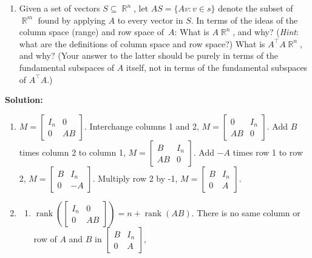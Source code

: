 \documentclass{article}
\DeclareMathOperator{\rank}{\mathrm{rank}}
\DeclareMathOperator{\R}{\mathbb{R}}
\newenvironment{solution}{\color{blue} \smallskip \textbf{Solution:}}{}
\begin{document}
\begin{enumerate}
\begin{enumerate}
        \item
        Given a set of vectors $S \subseteq \R^n$, let $AS = \{ Av: v \in s \}$ denote the subset of $\R^m$ found by applying $A$ to every vector in $S$.
        In terms of the ideas of the column space (range) and row space of~$A$: 
        What is $A\R^n$, and why? (\emph{Hint}: what are the definitions of column space and row space?)
        What is $A^\top A\R^n$, and why? (Your answer to the latter should be purely in terms of the fundamental subspaces of $A$ itself, not in terms of the fundamental subspaces of $A^\top A$.)
    \end{enumerate}
    
    \begin{solution}
        \begin{enumerate}
        \item$
            M = \begin{bmatrix}
            I_n & 0 \\
            0 & AB
            \end{bmatrix}
        $. Interchange columns 1 and 2, $
            M = \begin{bmatrix}
            0 & I_n \\
            AB & 0
            \end{bmatrix}
        $. Add $B$ times column 2 to column 1, $
            M = \begin{bmatrix}
            B & I_n \\
            AB & 0
            \end{bmatrix}
        $. Add $-A$ times row 1 to row 2, $
            M = \begin{bmatrix}
            B & I_n \\
            0 & -A
            \end{bmatrix}
        $. Multiply row 2 by -1, $
        M = \begin{bmatrix}
            B & I_n \\
            0 & A
            \end{bmatrix}
        $.
        \item 
        \begin{enumerate}
            \item
            $\rank(\begin{bmatrix} I_n & 0 \\ 0 & AB \end{bmatrix}) = n + \rank(AB)$. 
            There is no same column or row of $A$ and $B$ in $\begin{bmatrix} B & I_n \\ 0 & A \end{bmatrix}$, 

\end{enumerate}
\end{enumerate}
\end{solution}
\end{enumerate}
\end{document}
